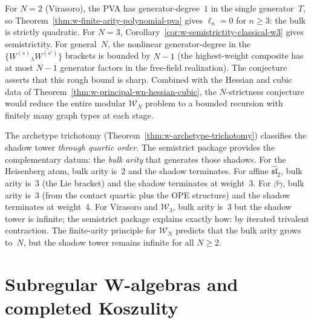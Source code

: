 \begin{remark}
\label{rem:w-finite-arity-evidence}
For $N = 2$ (Virasoro), the PVA has generator-degree~$1$ in the
single generator~$T$, so
Theorem~\ref{thm:w-finite-arity-polynomial-pva} gives $\ell_n = 0$
for $n \ge 3$: the bulk is strictly quadratic.  For $N = 3$,
Corollary~\ref{cor:w-semistrictity-classical-w3} gives semistrictity.
For general~$N$, the nonlinear generator-degree in the
$\{W^{(s)}{}_\lambda W^{(s')}\}$ brackets is bounded by $N-1$ (the
highest-weight composite has at most $N-1$ generator factors in the
free-field realization).  The conjecture asserts that this rough bound
is sharp.  Combined with the Hessian and cubic data of
Theorem~\ref{thm:w-principal-wn-hessian-cubic}, the $N$-strictness
conjecture would reduce the entire modular $\mathcal{W}_N$ problem to
a bounded recursion with finitely many graph types at each stage.
\end{remark}

\begin{remark}
\label{rem:w-semistrict-archetype-connection}
The archetype trichotomy
(Theorem~\ref{thm:w-archetype-trichotomy}) classifies the shadow
tower \emph{through quartic order}.  The semistrict package
provides the complementary datum: the \emph{bulk arity} that
generates those shadows.  For the Heisenberg atom, bulk arity is~$2$
and the shadow terminates.  For affine $\widehat{\mathfrak{sl}}_2$,
bulk arity is~$3$ (the Lie bracket) and the shadow terminates at
weight~$3$.  For $\beta\gamma$, bulk arity is~$3$ (from the contact
quartic plus the OPE structure) and the shadow terminates at
weight~$4$.  For Virasoro and $\mathcal{W}_3$, bulk arity
is~$3$ but the shadow tower is infinite; the semistrict
package explains exactly how: by iterated trivalent contraction.
The finite-arity principle for $\mathcal{W}_N$ predicts that the
bulk arity grows to~$N$, but the shadow tower remains infinite for
all $N \ge 2$.
\end{remark}


\section{Subregular W-algebras and completed Koszulity}
\label{sec:subregular-completed-koszulity}

